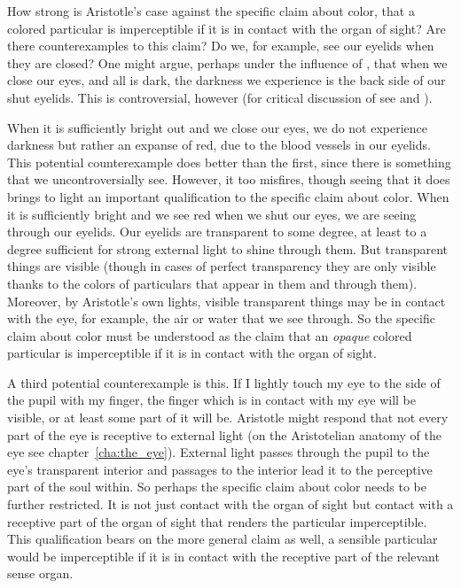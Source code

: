 How strong is Aristotle's case against the specific claim about color, that a colored particular is imperceptible if it is in contact with the organ of sight? Are there counterexamples to this claim? Do we, for example, see our eyelids when they are closed? One might argue, perhaps under the influence of \citet{Sorensen:2008kx}, that when we close our eyes, and all is dark, the darkness we experience is the back side of our shut eyelids. This is controversial, however (for critical discussion of \citealt{Sorensen:2008kx} see \citealt{Soteriou:2011fk} and \citealt{Phillips:2013ph}). 

When it is sufficiently bright out and we close our eyes, we do not experience darkness but rather an expanse of red, due to the blood vessels in our eyelids. This potential counterexample does better than the first, since there is something that we uncontroversially see. However, it too misfires, though seeing that it does brings to light an important qualification to the specific claim about color. When it is sufficiently bright and we see red when we shut our eyes, we are seeing through our eyelids. Our eyelids are transparent to some degree, at least to a degree sufficient for strong external light to shine through them. But transparent things are visible (though in cases of perfect transparency they are only visible thanks to the colors of particulars that appear in them and through them). Moreover, by Aristotle's own lights, visible transparent things may be in contact with the eye, for example, the air or water that we see through. So the specific claim about color must be understood as the claim that an \emph{opaque} colored particular is imperceptible if it is in contact with the organ of sight.

A third potential counterexample is this. If I lightly touch my eye to the side of the pupil with my finger, the finger which is in contact with my eye will be visible, or at least some part of it will be. Aristotle might respond that not every part of the eye is receptive to external light (on the Aristotelian anatomy of the eye see chapter~\ref{cha:the_eye}). External light passes through the pupil to the eye's transparent interior and passages to the interior lead it to the perceptive part of the soul within. So perhaps the specific claim about color needs to be further restricted. It is not just contact with the organ of sight but contact with a receptive part of the organ of sight that renders the particular imperceptible. This qualification bears on the more general claim as well, a sensible particular would be imperceptible if it is in contact with the receptive part of the relevant sense organ.

